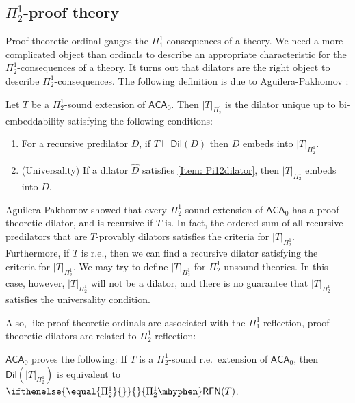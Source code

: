 \documentclass{mhkr}
\newcommand{\added}[1]{#1}
\newcommand{\Dil}{\mathsf{Dil}}
\newcommand{\RFN}[1][]{\ifthenelse{\equal{#1}{}}{}{#1\mhyphen}\mathsf{RFN}}
\newcommand{\ACA}{\mathsf{ACA}}
\begin{document}
\subsection{\texorpdfstring{$\Pi^1_2$}{Pi 1 2}-proof theory}
Proof-theoretic ordinal gauges the $\Pi^1_1$-consequences of a theory. We need a more complicated object than ordinals to describe an appropriate characteristic for the $\Pi^1_2$-consequences of a theory. It turns out that dilators are the right object to describe $\Pi^1_2$-consequences. The following definition is due to \added{Aguilera-Pakhomov} \cite{AguileraPakhomov2023Pi12}:
\begin{definition}
    Let $T$ be a $\Pi^1_2$-sound extension of $\ACA_0$. Then $|T|_{\Pi^1_2}$ is the dilator unique up to bi-embeddability satisfying the following conditions:
    \begin{enumerate}
        \item\label{Item: Pi12dilator} For a recursive predilator $D$, if $T\vdash \Dil(D)$ then $D$ embeds into $|T|_{\Pi^1_2}$.
        \item (Universality) If a dilator $\hat{D}$ satisfies \eqref{Item: Pi12dilator}, then $|T|_{\Pi^1_2}$ embeds into $\hat{D}$.
    \end{enumerate}
\end{definition}
\added{Aguilera-Pakhomov} \cite{AguileraPakhomov2023Pi12} showed that every $\Pi^1_2$-sound extension of $\ACA_0$ has a proof-theoretic dilator, and is recursive if $T$ is. In fact, \added{the ordered sum of all recursive predilators that are $T$-provably dilators satisfies the criteria for $|T|_{\Pi^1_2}$}. Furthermore, if $T$ is r.e.\added{,} then we can \added{find a recursive dilator satisfying the criteria for $|T|_{\Pi^1_2}$}. 
We may try to define $|T|_{\Pi^1_2}$ for $\Pi^1_2$-unsound theories. In this case, however, $|T|_{\Pi^1_2}$ will not be a dilator, and there is no guarantee that $|T|_{\Pi^1_2}$ satisfies the universality condition.

Also, like proof-theoretic ordinals \added{are} associated with the $\Pi^1_1$-reflection, proof-theoretic dilators are related to $\Pi^1_2$-reflection:
\begin{theorem} \label{Theorem: Proof-theoretic dilator and Pi 1 2 reflection}\pushQED{\qed}
    $\ACA_0$ proves the following: If $T$ is a $\Pi^1_2$-sound r.e.\ extension of $\ACA_0$, then $\Dil(|T|_{\Pi^1_2})$ is equivalent to $\RFN[\Pi^1_2](T)$. \qedhere 
\end{theorem}
\end{document}
